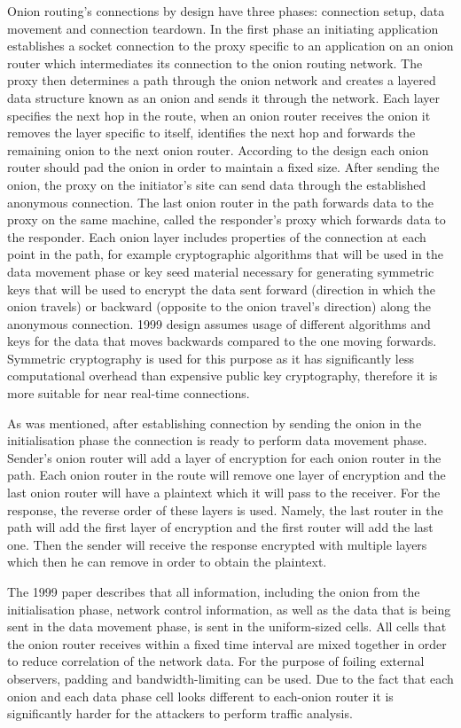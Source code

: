 Onion routing’s connections by design have three phases: connection setup, data movement and connection teardown. In the first phase an initiating application establishes a socket connection to the proxy specific to an application on an onion router which intermediates its connection to the onion routing network. The proxy then determines a path through the onion network and creates a layered data structure known as an onion and sends it through the network. Each layer specifies the next hop in the route, when an onion router receives the onion it removes the layer specific to itself, identifies the next hop and forwards the remaining onion to the next onion router. According to the design each onion router should pad the onion in order to maintain a fixed size. After sending the onion, the proxy on the initiator’s site can send data through the established anonymous connection. The last onion router in the path forwards data to the proxy on the same machine, called the responder’s proxy which forwards data to the responder.
Each onion layer includes properties of the connection at each point in the path, for example cryptographic algorithms that will be used in the data movement phase or key seed material necessary for generating symmetric keys that will be used to encrypt the data sent forward (direction in which the onion travels) or backward (opposite to the onion travel’s direction) along the anonymous connection. 1999 design assumes usage of different algorithms and keys for the data that moves backwards compared to the one moving forwards. Symmetric cryptography is used for this purpose as it has significantly less computational overhead than expensive public key cryptography, therefore it is more suitable for near real-time connections.

As was mentioned, after establishing connection by sending the onion in the initialisation phase the connection is ready to perform data movement phase. Sender’s onion router will add a layer of encryption for each onion router in the path. Each onion router in the route will remove one layer of encryption and the last onion router will have a plaintext which it will pass to the receiver. For the response, the reverse order of these layers is used. Namely, the last router in the path will add the first layer of encryption and the first router will add the last one. Then the sender will receive the response encrypted with multiple layers which then he can remove in order to obtain the plaintext.

The 1999 paper describes that all information, including the onion from the initialisation phase, network control information, as well as the data that is being sent in the data movement phase, is sent in the uniform-sized cells. All cells that the onion router receives within a fixed time interval are mixed together in order to reduce correlation of the network data. For the purpose of foiling external observers, padding and bandwidth-limiting can be used. Due to the fact that each onion and each data phase cell looks different to each-onion router it is significantly harder for the attackers to perform traffic analysis.


